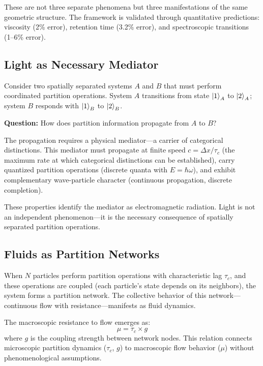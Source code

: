 \documentclass[twocolumn,superscriptaddress,prb,10pt]{revtex4-2}
\begin{document}
These are not three separate phenomena but three manifestations of the same geometric structure. The framework is validated through quantitative predictions: viscosity (2\% error), retention time (3.2\% error), and spectroscopic transitions (1--6\% error).

\subsection{Light as Necessary Mediator}

Consider two spatially separated systems $A$ and $B$ that must perform coordinated partition operations. System $A$ transitions from state $\ket{1}_A$ to $\ket{2}_A$; system $B$ responds with $\ket{1}_B$ to $\ket{2}_B$.

\textbf{Question:} How does partition information propagate from $A$ to $B$?

The propagation requires a physical mediator—a carrier of categorical distinctions. This mediator must propagate at finite speed $c = \Delta x/\tau_c$ (the maximum rate at which categorical distinctions can be established), carry quantized partition operations (discrete quanta with $E = \hbar\omega$), and exhibit complementary wave-particle character (continuous propagation, discrete completion).

These properties identify the mediator as electromagnetic radiation. Light is not an independent phenomenon—it is the necessary consequence of spatially separated partition operations.

\subsection{Fluids as Partition Networks}

When $N$ particles perform partition operations with characteristic lag $\tau_c$, and these operations are coupled (each particle's state depends on its neighbors), the system forms a partition network. The collective behavior of this network—continuous flow with resistance—manifests as fluid dynamics.

The macroscopic resistance to flow emerges as:
\begin{equation}
\mu = \tau_c \times g
\label{eq:viscosity_intro}
\end{equation}
where $g$ is the coupling strength between network nodes. This relation connects microscopic partition dynamics ($\tau_c$, $g$) to macroscopic flow behavior ($\mu$) without phenomenological assumptions.
\end{document}
